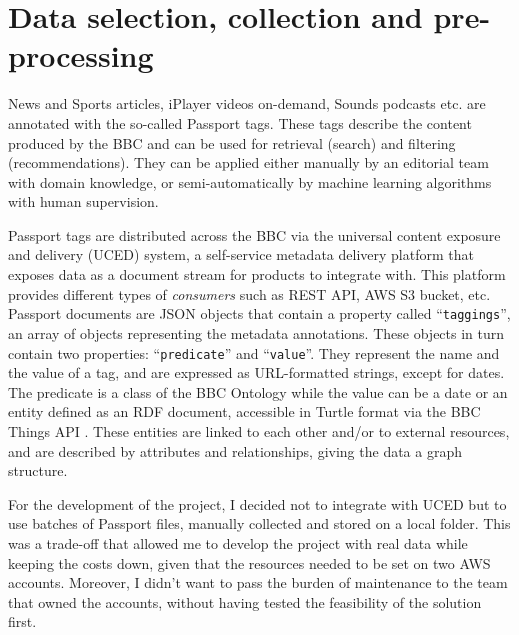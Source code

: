 
\section{Data selection, collection and pre-processing}


News and Sports articles, iPlayer videos on-demand, Sounds podcasts etc. are annotated with the so-called Passport tags.
These tags describe the content produced by the BBC and can be used for retrieval (search) and filtering (recommendations).
They can be applied either manually by an editorial team with domain knowledge,
or semi-automatically by machine learning algorithms with human supervision.

Passport tags are distributed across the BBC via the universal content exposure and delivery (UCED) system,
a self-service metadata delivery platform that exposes data as a document stream for products to integrate with.
This platform provides different types of \textit{consumers} such as REST API, AWS S3 bucket, etc.
Passport documents are JSON objects that contain a property called ``\verb|taggings|'', an array of objects representing the
metadata annotations. These objects in turn contain two properties: ``\verb|predicate|'' and ``\verb|value|''. They represent the name and the value of
a tag, and are expressed as URL-formatted strings, except for dates. The predicate is a class of the BBC Ontology \cite{BBC:Ontologies}
while the value can be a date or an entity defined as an RDF \cite{W3C:RDF,W3C:RDF:Concepts} document,
accessible in Turtle format \cite{W3C:Turtle} via the BBC Things API \cite{BBC:Things,BBC:Things:About,BBC:Things:API}.
These entities are linked to each other and/or to external resources, and are described by attributes and relationships, giving the
data a graph structure.


For the development of the project, I decided not to integrate with UCED but to use batches of Passport files, manually collected and stored
on a local folder.
This was a trade-off that allowed me to develop the project with real data while keeping the costs down, given that the resources needed to
be set on two AWS accounts. Moreover, I didn't want to pass the burden of maintenance to the team that owned the accounts, without having tested
the feasibility of the solution first.

